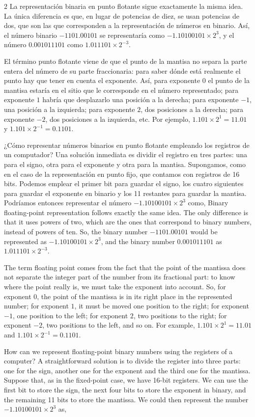 \begin{paracol}{2}
La representación binaria en punto flotante sigue exactamente la misma idea. La única diferencia es que, en lugar de potencias de diez, se usan potencias de dos, que son las que corresponden a la representación de números en binario. Así, el número binario $-1101.00101$ se representaría como $-1.10100101\times 2^3$, y el número $0.001011101$ como $1.011101\times 2^{-3}$.

El término punto flotante viene de que el punto de la mantisa no separa la parte entera del número de su parte fraccionaria: para saber dónde está realmente el punto hay que tener en cuenta el exponente. Así, para exponente $0$ el punto de la mantisa estaría en el sitio que le corresponde en el número representado; para exponente $1$ habría que desplazarlo una posición a la derecha; para exponente $-1$, una posición a la izquierda; para exponente $2$, dos posiciones a la derecha; para exponente $-2$, dos posiciones a la izquierda, etc. Por ejemplo, $1.101\times 2^1=11.01$ y $1.101\times 2^{-1}=0.1101$.

¿Cómo representar números binarios en punto flotante empleando los registros de un computador? Una solución inmediata es dividir el registro en tres partes: una para el signo, otra para el exponente y otra para la mantisa. Supongamos, como en el caso de la representación en punto fijo, que contamos con registros de 16 bits. Podemos emplear el primer bit para guardar el signo, los cuatro siguientes para guardar el exponente en binario y los 11 restantes para guardar la mantisa. Podríamos entonces representar el número $-1.10100101\times 2^3$ como,
\switchcolumn
Binary floating-point representation follows exactly the same idea. The only difference is that it uses powers of two, which are the ones that correspond to binary numbers, instead of powers of ten. So, the binary number $-1101.00101$ would be represented as $-1.10100101\times 2^3$, and the binary number $0.001011101$ as $1.011101\times 2^{-3}$.

The term floating point comes from the fact that the point of the mantissa does not separate the integer part of the number from its fractional part: to know where the point really is, we must take the exponent into account. So, for exponent $0$, the point of the mantissa is in its right place in the represented number; for exponent $1$, it must be moved one position to the right; for exponent $-1$, one position to the left; for exponent $2$, two positions to the right; for exponent $-2$, two positions to the left, and so on. For example, $1.101\times 2^1=11.01$ and $1.101\times 2^{-1}=0.1101$.

How can we represent floating-point binary numbers using the registers of a computer? A straightforward solution is to divide the register into three parts: one for the sign, another one for the exponent and the third one for the mantissa. Suppose that, as in the fixed-point case, we have 16-bit registers. We can use the first bit to store the sign, the next four bits to store the exponent in binary, and the remaining 11 bits to store the mantissa. We could then represent the number $-1.10100101\times 2^3$ as,
\end{paracol}

